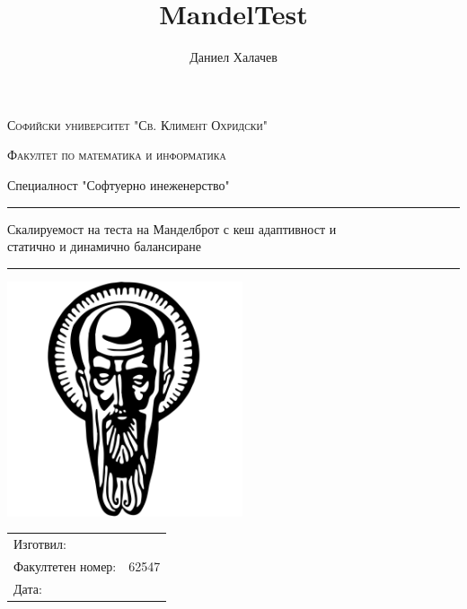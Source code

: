 \documentclass[a4paper,11pt]{article}
\author{Даниел Халачев}
\title{MandelTest}
\newcommand{\subtitle}{Скалируемост на теста на Манделброт с кеш адаптивност и \\ статично и динамично балансиране }
\newcommand{\studentnumber}{62547}
\newcommand{\program}{Софтуерно инеженерство}
\begin{document}
\begin{titlepage}
\makeatletter
\begin{center}
	\textsc{Софийски университет "Св. Климент Охридски"}
	\par \textsc{Факултет по математика и информатика}
	\par Специалност "\program"

	\vfill \hrule height .08em \bigskip
	\par\huge\@title\bigskip
	\par\Large\subtitle\bigskip
	\hrule height .08em\normalsize
	
	\vfill
	\includegraphics[width=\textwidth,height=0.25\textheight,keepaspectratio]{SU.png} %
	\vfill
	
	\begin{tabular}{ll}
		\toprule
		Изготвил: & \@author\\
		Факултетен номер: & \studentnumber\\
		Дата: & \@date\\
		\bottomrule
	\end{tabular}
	
	\vfill
\end{center}
\makeatother
\end{titlepage}
\end{document}
